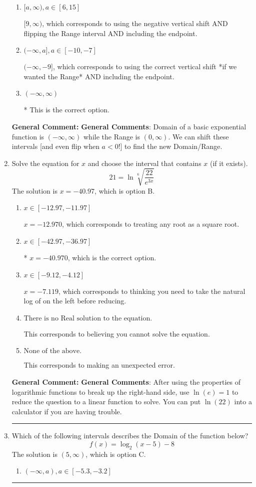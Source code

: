 \documentclass{extbook}[14pt]
\newcommand{\litem}[1]{\item #1

\rule{\textwidth}{0.4pt}}
\begin{document}
\begin{enumerate}
{\begin{enumerate}[label=\Alph*.]
$(-\infty, -9)$, which corresponds to using the correct vertical shift *if we wanted the Range*.
\item \( [a, \infty), a \in [6, 15] \)

$[9, \infty)$, which corresponds to using the negative vertical shift AND flipping the Range interval AND including the endpoint.
\item \( (-\infty, a], a \in [-10, -7] \)

$(-\infty, -9]$, which corresponds to using the correct vertical shift *if we wanted the Range* AND including the endpoint.
\item \( (-\infty, \infty) \)

* This is the correct option.
\end{enumerate}

\textbf{General Comment:} \textbf{General Comments}: Domain of a basic exponential function is $(-\infty, \infty)$ while the Range is $(0, \infty)$. We can shift these intervals [and even flip when $a<0$!] to find the new Domain/Range.
}
\litem{
 Solve the equation for $x$ and choose the interval that contains $x$ (if it exists).
\[  21 = \ln{\sqrt[6]{\frac{22}{e^{3x}}}} \]The solution is \( x = -40.97 \), which is option B.\begin{enumerate}[label=\Alph*.]
\item \( x \in [-12.97, -11.97] \)

$x = -12.970$, which corresponds to treating any root as a square root.
\item \( x \in [-42.97, -36.97] \)

* $x = -40.970$, which is the correct option.
\item \( x \in [-9.12, -4.12] \)

$x = -7.119$, which corresponds to thinking you need to take the natural log of on the left before reducing.
\item \( \text{There is no Real solution to the equation.} \)

This corresponds to believing you cannot solve the equation.
\item \( \text{None of the above.} \)

This corresponds to making an unexpected error.
\end{enumerate}

\textbf{General Comment:} \textbf{General Comments}: After using the properties of logarithmic functions to break up the right-hand side, use $\ln(e) = 1$ to reduce the question to a linear function to solve. You can put $\ln(22)$ into a calculator if you are having trouble.
}
\litem{
Which of the following intervals describes the Domain of the function below?
\[ f(x) = \log_2{(x-5)}-8 \]The solution is \( (5, \infty) \), which is option C.\begin{enumerate}[label=\Alph*.]
\item \( (-\infty, a), a \in [-5.3, -3.2] \)


\end{enumerate}}
\end{enumerate}
\end{document}
